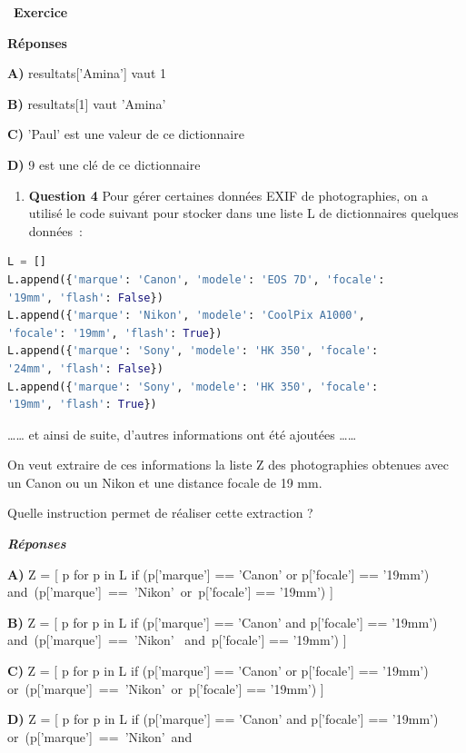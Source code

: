 \documentclass[
  11pt,
]{article}
\providecommand{\tightlist}{%
  \setlength{\itemsep}{0pt}\setlength{\parskip}{0pt}}
\newcounter{exo}
\newenvironment{exercice}[1]
{\par \medskip   \addtocounter{exo}{1} \noindent  
\begin{bclogo}[arrondi =0.1,   noborder = true, logo=\bccrayon, marge=4]{~\textbf{Exercice} \textbf{\theexo} {\itshape #1} }  \par}
{
\end{bclogo}
 \par \bigskip }
\newcounter{rque}
\newcounter{def}
\begin{document}
\begin{exercice}{}
\textbf{Réponses}

\textbf{A)} resultats{[}'Amina'{]} vaut 1

\textbf{B)} resultats{[}1{]} vaut 'Amina'

\textbf{C)} 'Paul' est une valeur de ce dictionnaire

\textbf{D)} 9 est une clé de ce dictionnaire

\begin{enumerate}
\def\labelenumi{\arabic{enumi}.}
\setcounter{enumi}{3}
\tightlist
\item
  \textbf{Question 4} Pour gérer certaines données EXIF de
  photographies, on a utilisé le code suivant pour stocker dans une
  liste L de dictionnaires quelques données~:
\end{enumerate}

\begin{lstlisting}[language=Python]
L = []
L.append({'marque': 'Canon', 'modele': 'EOS 7D', 'focale':
'19mm', 'flash': False})
L.append({'marque': 'Nikon', 'modele': 'CoolPix A1000',
'focale': '19mm', 'flash': True})
L.append({'marque': 'Sony', 'modele': 'HK 350', 'focale':
'24mm', 'flash': False})
L.append({'marque': 'Sony', 'modele': 'HK 350', 'focale':
'19mm', 'flash': True})
\end{lstlisting}

\ldots{}\ldots{} et ainsi de suite, d'autres informations ont été
ajoutées \ldots{}\ldots{}

On veut extraire de ces informations la liste Z des photographies
obtenues avec un Canon ou un Nikon et une distance focale de 19 mm.

Quelle instruction permet de réaliser cette extraction ?

\textbf{\emph{Réponses}}

\textbf{A)} Z = {[} p for p in L if (p{[}'marque'{]} == 'Canon' or
p{[}'focale'{]} == '19mm')
and~(p{[}'marque'{]}~==~'Nikon'~or~p{[}'focale'{]} == '19mm') {]}

\textbf{B)} Z = {[} p for p in L if (p{[}'marque'{]} == 'Canon' and
p{[}'focale'{]} == '19mm') and~(p{[}'marque'{]}~==~'Nikon'
~and~p{[}'focale'{]} == '19mm') {]}

\textbf{C)} Z = {[} p for p in L if (p{[}'marque'{]} == 'Canon' or
p{[}'focale'{]} == '19mm')
or~(p{[}'marque'{]}~==~'Nikon'~or~p{[}'focale'{]} == '19mm') {]}

\textbf{D)} Z = {[} p for p in L if (p{[}'marque'{]} == 'Canon' and
p{[}'focale'{]} == '19mm') or~(p{[}'marque'{]}~==~'Nikon'~and~


\end{exercice}
\end{document}
